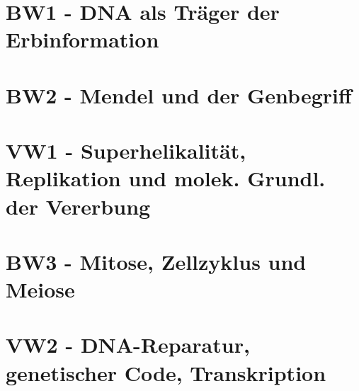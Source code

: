 
\usepackage[ngerman]{babel}






\glsaddall



\usepackage{biblatex}


\newcommand\reporttitle{Vorlesung Grundlagen der molekularen Biologie II}
\newcommand\reportsubtitle{Sommersemester 2026}
\newcommand\profs{Vorlesung von Prof. Weisshaar, Prof. Wendisch und Prof. Hoffman}
\newcommand\reportsubsubtitle{Vorlesungsnotizen und Aufarbeitung}
\newcommand\reportauthors{
    \textbf{Liliana Sanfilippo}
}


    \frontmatter
    

    \tableofcontents
    \mainmatter
    \chapter{BW1 - DNA als Träger der Erbinformation}
    

    \chapter{BW2 - Mendel und der Genbegriff}
    

    \chapter{VW1 - Superhelikalität, Replikation und molek. Grundl. der Vererbung}
    

    \chapter{BW3 - Mitose, Zellzyklus und Meiose}
    

    \chapter{VW2 - DNA-Reparatur, genetischer Code, Transkription}
    

